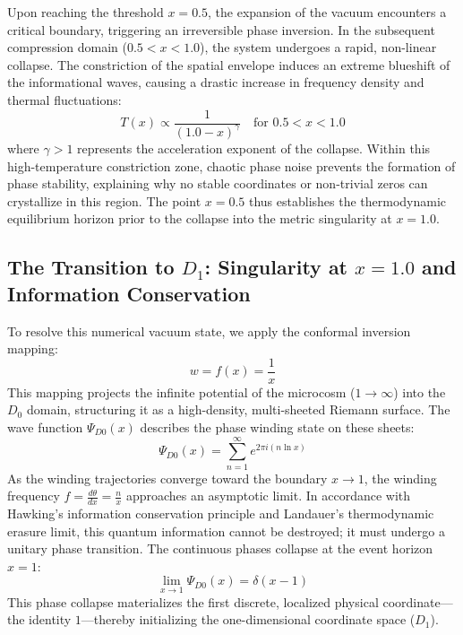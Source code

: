 \documentclass[11pt,a4paper]{article}
\theoremstyle{plain}
\theoremstyle{definition}
\theoremstyle{remark}
\begin{document}
Upon reaching the threshold $x = 0.5$, the expansion of the vacuum encounters a critical boundary, triggering an irreversible phase inversion. In the subsequent compression domain ($0.5 < x < 1.0$), the system undergoes a rapid, non-linear collapse. The constriction of the spatial envelope induces an extreme blueshift of the informational waves, causing a drastic increase in frequency density and thermal fluctuations:
\begin{equation}
T(x) \propto \frac{1}{(1.0 - x)^{\gamma}} \quad \text{for } 0.5 < x < 1.0
\end{equation}
where $\gamma > 1$ represents the acceleration exponent of the collapse. Within this high-temperature constriction zone, chaotic phase noise prevents the formation of phase stability, explaining why no stable coordinates or non-trivial zeros can crystallize in this region. The point $x = 0.5$ thus establishes the thermodynamic equilibrium horizon prior to the collapse into the metric singularity at $x = 1.0$.


\newpage
\subsection{The Transition to $D_1$: Singularity at $x = 1.0$ and Information Conservation}
To resolve this numerical vacuum state, we apply the conformal inversion mapping:
\begin{equation}
w = f(x) = \frac{1}{x}
\end{equation}
This mapping projects the infinite potential of the microcosm ($1 \to \infty$) into the $D_0$ domain, structuring it as a high-density, multi-sheeted Riemann surface. The wave function $\Psi_{D0}(x)$ describes the phase winding state on these sheets:
\begin{equation}
\Psi_{D0}(x) = \sum_{n=1}^{\infty} e^{2\pi i (n \ln x)}
\end{equation}
As the winding trajectories converge toward the boundary $x \to 1$, the winding frequency $f = \frac{d\theta}{dx} = \frac{n}{x}$ approaches an asymptotic limit. In accordance with Hawking's information conservation principle and Landauer's thermodynamic erasure limit, this quantum information cannot be destroyed; it must undergo a unitary phase transition. The continuous phases collapse at the event horizon $x = 1$:
\begin{equation}
\lim_{x \to 1} \Psi_{D0}(x) = \delta(x - 1)
\end{equation}
This phase collapse materializes the first discrete, localized physical coordinate—the identity $1$—thereby initializing the one-dimensional coordinate space ($D_1$).
\end{document}
